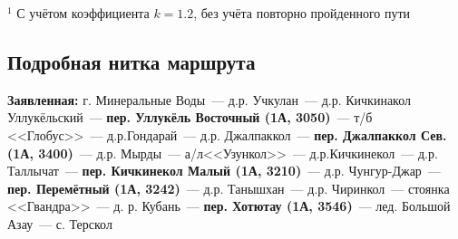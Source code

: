 \begin{table}[h!]
\end{table}
\footnotesize{$^1$ С учётом коэффициента $k=1.2$, без учёта повторно пройденного пути}
\normalsize

\subsection{Подробная нитка маршрута}
\textbf{Заявленная:} г. Минеральные Воды~--- д.р. Учкулан~--- д.р. Кичкинакол Уллукёльский~--- \textbf{пер. Уллукёль Восточный (1А, 3050)}~--- т/б <<Глобус>>~--- д.р.Гондарай~--- д.р. Джалпаккол~--- \textbf{пер. Джалпаккол Сев. (1А, 3400)}~--- д.р. Мырды~--- а/л<<Узункол>>~--- д.р.Кичкинекол~--- д.р. Таллычат~--- \textbf{пер. Кичкинекол Малый (1А, 3210)}~--- д.р. Чунгур-Джар~--- \textbf{пер. Перемётный (1А, 3242)}~--- д.р. Танышхан~--- д.р. Чиринкол~--- стоянка <<Гвандра>>~--- д. р. Кубань~--- \textbf{пер. Хотютау (1А, 3546)}~--- лед. Большой Азау~--- с. Терскол

